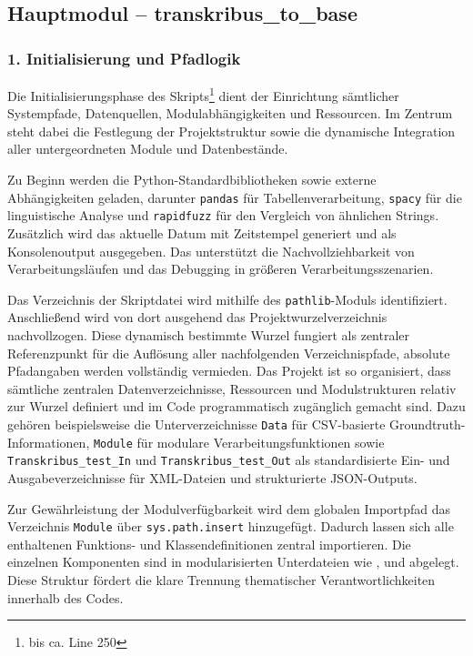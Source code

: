 \documentclass[12pt, a4paper, ngerman, bidi=default]{article}
\newcommand{\code}[1]{\colorbox{VeryLightGray}{\texttt{#1}}} %
\begin{document}
\subsection{Hauptmodul -- transkribus\_to\_base}\label{sec:transkribus_to_base}
\subsubsection*{1. Initialisierung und Pfadlogik}

Die Initialisierungsphase des Skripts\footnote{bis ca. Line 250} dient der Einrichtung sämtlicher Systempfade, Datenquellen, 
Modulabhängigkeiten und Ressourcen. Im Zentrum steht dabei die Festlegung der Projektstruktur sowie die dynamische Integration 
aller untergeordneten Module und Datenbestände.

Zu Beginn werden die Python-Standardbibliotheken sowie externe Abhängigkeiten geladen, darunter \code{pandas} für 
Tabellenverarbeitung, \code{spacy} für die linguistische Analyse und \code{rapidfuzz} für den Vergleich von ähnlichen Strings. Zusätzlich 
wird das aktuelle Datum mit Zeitstempel generiert und als Konsolenoutput ausgegeben. Das unterstützt die Nachvollziehbarkeit von
Verarbeitungsläufen und das Debugging in größeren Verarbeitungsszenarien.

Das Verzeichnis der Skriptdatei wird mithilfe des \code{pathlib}-Moduls identifiziert. Anschließend wird von dort ausgehend das 
Projektwurzelverzeichnis nachvollzogen. Diese dynamisch bestimmte Wurzel fungiert als zentraler Referenzpunkt für die Auflösung 
aller nachfolgenden Verzeichnispfade, absolute Pfadangaben werden vollständig vermieden.  
Das Projekt ist so organisiert, dass sämtliche zentralen Datenverzeichnisse, Ressourcen und Modulstrukturen relativ
zur Wurzel definiert und im Code programmatisch zugänglich gemacht sind. Dazu gehören beispielsweise die 
Unterverzeichnisse \code{Data} für CSV-basierte Groundtruth-Informationen, \code{Module} für modulare 
Verarbeitungsfunktionen sowie \code{Transkribus\_test\_In} und \code{Transkribus\_test\_Out} als standardisierte 
Ein- und Ausgabeverzeichnisse für XML-Dateien und strukturierte JSON-Outputs.

Zur Gewährleistung der Modulverfügbarkeit wird dem globalen Importpfad das Verzeichnis \code{Module} über \code{sys.path.insert} hinzugefügt. 
Dadurch lassen sich alle enthaltenen Funktions- und Klassendefinitionen zentral importieren. Die einzelnen Komponenten sind in 
modularisierten Unterdateien wie ,  und  abgelegt. 
Diese Struktur fördert die klare Trennung thematischer Verantwortlichkeiten innerhalb des Codes.
\end{document}
